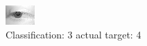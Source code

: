 \begin{figure}[h!]
\begin{center}
\includegraphics[width=0.60\columnwidth]{figures/ID2711_class_3_target_4.png}
\end{center}
\caption{ Classification: 3 actual target: 4}
\label{fig:ID2711_class_3_target_4}
\end{figure}
